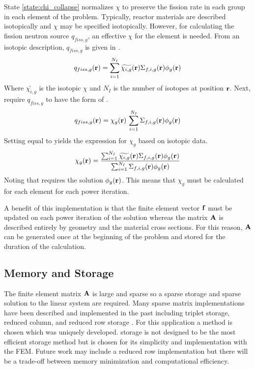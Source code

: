     State \ref{state:chi_collapse} normalizes $\chi$ to preserve the fission
    rate in each group in each element of the problem. Typically, reactor
    materials are described isotopically and $\chi$ may be specified
    isotopically. However, for calculating the fission neutron source
    $q_{fiss,g}$, an effective $\chi$ for the element is needed. From an
    isotopic description, $q_{fiss,g}$ is given in .
    \begin{equation}
      \label{eq:isotopic_chi}
      q_{fiss,g}(\mathbf{r}) = \sum_{i=1}^{N_I} \widetilde{\chi_{i,g}}(\mathbf{r})
        \Sigma_{f,i,g}(\mathbf{r}) \phi_g(\mathbf{r})
    \end{equation}
    Where $\widetilde{\chi_{i,g}}$ is the isotopic $\chi$ and $N_I$ is the 
    number of isotopes at position $\mathbf{r}$. Next, require $q_{fiss,g}$ to have the 
    form of
    .
    \begin{equation}
      \label{eq:element_chi}
      q_{fiss,g}(\mathbf{r}) = \chi_g(\mathbf{r}) \, \sum_{i=1}^{N_I} \Sigma_{f,i,g}(\mathbf{r})
        \phi_g(\mathbf{r})
    \end{equation}
    Setting  equal to  yields the
    expression for $\chi_g$ based on isotopic data.
    \begin{equation}
      \label{eq:chi_collapse}
      \chi_g(\mathbf{r}) = \frac{\sum_{i=1}^{N_I} \widetilde{\chi_{i,g}}(\mathbf{r})
        \Sigma_{f,i,g}(\mathbf{r}) \phi_g(\mathbf{r})}{\sum_{i=1}^{N_I} \Sigma_{f,i,g}(\mathbf{r})
        \phi_g(\mathbf{r})}
    \end{equation}
    Noting that  requires the solution $\phi_g(\mathbf{r})$. This
    means that $\chi_g$ must be calculated for each element for each power
    iteration.
    
    A benefit of this implementation is that the finite element vector $\mathbf{f}$ 
    must be updated on each power iteration of the solution whereas the matrix 
    $\mathbf{A}$ is described entirely by geometry and the material cross sections. For
    this reason, $\mathbf{A}$ can be generated once at the beginning of the problem and 
    stored for the duration of the calculation.
    \FloatBarrier %

  \subsection{Memory and Storage}
    The finite element matrix $\mathbf{A}$ is large and sparse so a sparse storage and
    sparse solution to the linear system are required. Many sparse matrix 
    implementations have been described and implemented in the past including
    triplet storage, reduced column, and reduced row storage \cite{sparseBLAS}.
    For this application a \twotable method is chosen which was uniquely 
    developed. \twotable storage is not designed to be the most efficient 
    storage method but is chosen for its simplicity and implementation with the 
    FEM. Future work may include a reduced row implementation but there will be
    a trade-off between memory minimization and computational efficiency.
    
